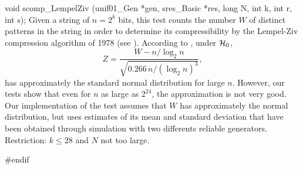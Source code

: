 void scomp_LempelZiv (unif01_Gen *gen, sres_Basic *res,
                      long N, int k, int r, int s);
\endcode
\tab
   Given a string of $n= 2^k$ bits, this test \cite{rRUK01a,rERD92a}
   counts the number $W$ of distinct patterns in the string in order to
   determine%
   its compressibility by the Lempel-Ziv compression
   algorithm of 1978 (see \cite{iZIV78a}).
   According to \cite{iKIR94a}, under $\mathcal{H}_0$,
   $$
     Z = \frac{W - {n}/{\log_2 n}}{\sqrt{{0.266\,n} /
        {(\log_2 n)^3}}},
   $$
   has approximately the standard normal distribution for large $n$.
   However, our tests show that even for $n$ as large as $2^{24}$,
   the approximation is not very good.
   Our implementation of the test assumes that $W$ has approximately
   the normal distribution, but uses estimates of its mean and
   standard deviation that have been obtained through simulation
   with two differents reliable generators.
   Restriction: $k \le 28$ and $N$ not too large.
\endtab

\code
\hide
#endif
\endhide
\endcode
